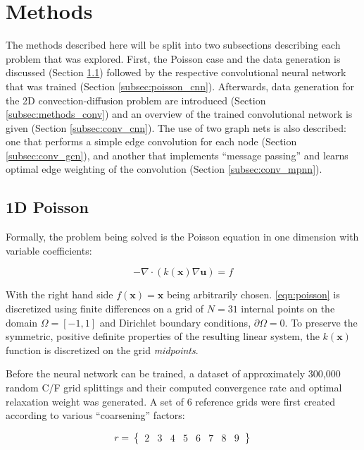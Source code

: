 \documentclass[review]{siamart190516}
\renewcommand{\vec}[1]{\bm{{#1}}}
\newcommand{\grad}{\nabla}
\begin{document}
\section{Methods}\label{sec:methods}

The methods described here will be split into two subsections describing each problem that was explored. First, the Poisson case and the data generation is discussed (Section \ref{subsec:methods_poisson}) followed by the respective convolutional neural network that was trained (Section \ref{subsec:poisson_cnn}).  Afterwards, data generation for the 2D convection-diffusion problem are introduced (Section \ref{subsec:methods_conv}) and an overview of the trained convolutional network is given (Section \ref{subsec:conv_cnn}).  The use of two graph nets is also described: one that performs a simple edge convolution for each node (Section \ref{subsec:conv_gcn}), and another that implements ``message passing'' and learns optimal edge weighting of the convolution (Section \ref{subsec:conv_mpnn}).

\subsection{1D Poisson}\label{subsec:methods_poisson}

Formally, the problem being solved is the Poisson equation in one dimension with variable coefficients:

\begin{equation} \label{eqn:poisson}
  -\grad \cdot \left(k\left(\vec{x}\right) \grad\vec{u}\right) = f
\end{equation}

With the right hand side $f\left(\vec{x}\right)=\vec{x}$ being arbitrarily chosen.  \ref{eqn:poisson} is discretized using finite differences on a grid of $N=31$ internal points on the domain $\Omega = \left[-1, 1\right]$ and Dirichlet boundary conditions, $\partial\Omega = 0$.  To preserve the symmetric, positive definite properties of the resulting linear system, the $k\left(\vec{x}\right)$ function is discretized on the grid \textit{midpoints}.

Before the neural network can be trained, a dataset of approximately 300,000 random C/F grid splittings and their computed convergence rate and optimal relaxation weight was generated.  A set of $6$ reference grids were first created according to various ``coarsening'' factors:

\begin{equation} \label{eqn:poisson_coarsening}
  r = \begin{Bmatrix} 2 & 3 & 4 & 5 & 6 & 7 & 8 & 9\end{Bmatrix}
\end{equation}
\end{document}
